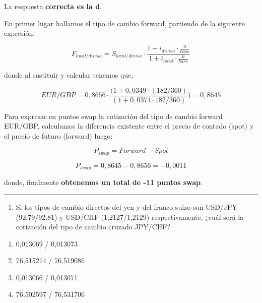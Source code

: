 \documentclass[
  letterpaper,
  DIV=11,
  numbers=noendperiod]{scrreprt}
\providecommand{\tightlist}{%
  \setlength{\itemsep}{0pt}\setlength{\parskip}{0pt}}\usepackage{longtable,booktabs,array}
\begin{document}
\begin{tcolorbox}[enhanced jigsaw, left=2mm, opacityback=0, colback=white, breakable, arc=.35mm, bottomrule=.15mm, rightrule=.15mm, toprule=.15mm, leftrule=.75mm, colframe=quarto-callout-tip-color-frame]
\begin{minipage}[t]{5.5mm}
\textcolor{quarto-callout-tip-color}{\faLightbulb}
\end{minipage}%
\begin{minipage}[t]{\textwidth - 5.5mm}

La respuesta \textbf{correcta es la d}.

En primer lugar hallamos el tipo de cambio forward, partiendo de la
siguiente expresión:

\[F_{local/divisa}=S_{local/divisa}\cdot{}\frac{1+i_{divisa}\cdot \frac{n}{base}}{1+i_{local}\cdot \frac{n}{base}}\]

donde al sustituir y calcular tenemos que,

\[EUR/GBP = 0,8656\cdot \frac{( 1 + 0,0349 \cdot (182 / 360)}{  ( 1 + 0,0374\cdot  182/ 360 )} ) = 0,8645\]

Para expresar en puntos swap la cotización del tipo de cambio forward
EUR/GBP, calculamos la diferencia existente entre el precio de contado
(spot) y el precio de futuro (forward) luego:

\[P_{swap} = Forward-Spot\]

\[P_{swap} = 0,8645-0,8656 = -0,0011\]

donde, finalmente \textbf{obtenemos un total de -11 puntos swap}.

\end{minipage}%
\end{tcolorbox}

\begin{center}\rule{0.5\linewidth}{0.5pt}\end{center}

\begin{enumerate}
\def\labelenumi{\arabic{enumi}.}
\setcounter{enumi}{52}
\tightlist
\item
  Si los tipos de cambio directos del yen y del franco suizo son USD/JPY
  (92,79/92,81) y USD/CHF (1,2127/1,2129) respectivamente, ¿cuál será la
  cotización del tipo de cambio cruzado JPY/CHF?
\end{enumerate}

\begin{enumerate}
\def\labelenumi{\alph{enumi})}
\item
  0,013069 / 0,013073
\item
  76,515214 / 76,519086
\item
  0,013066 / 0,013071
\item
  76,502597 / 76,531706
\end{enumerate}
\end{document}
